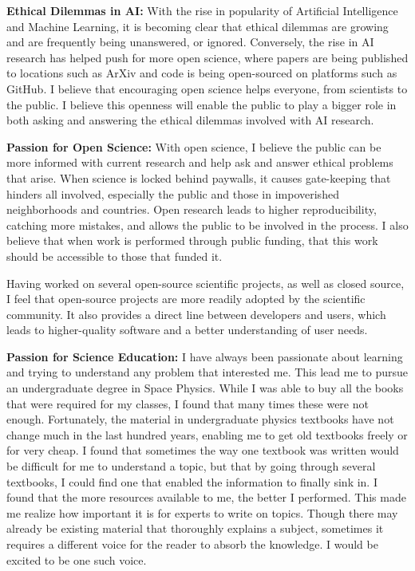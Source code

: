 \documentclass[12pt]{article}
\begin{document}
\textbf{Ethical Dilemmas in AI: }With the rise in popularity of Artificial
Intelligence and Machine Learning, it is becoming clear that ethical dilemmas
are growing and are frequently being unanswered, or ignored. Conversely, the
rise in AI research has helped push for more open science, where papers are
being published to locations such as ArXiv and code is being open-sourced on
platforms such as GitHub. I believe that encouraging open science helps
everyone, from scientists to the public. I believe this openness will enable the
public to play a bigger role in both asking and answering the ethical dilemmas
involved with AI research. 


\textbf{Passion for Open Science: }With open science, I believe the public can
be more informed with current research and help ask and answer ethical problems
that arise. When science is locked behind paywalls, it causes gate-keeping that
hinders all involved, especially the public and those in impoverished neighborhoods and countries. Open research leads to higher reproducibility,
catching more mistakes, and allows the public to be involved in the process. I
also believe that when work is performed through public funding, that this work
should be accessible to those that funded it.

Having worked on several open-source scientific projects, as well as closed
source, I feel that open-source projects are more readily adopted
by the scientific community. It also provides a direct line between developers and
users, which leads to higher-quality software and a better understanding of
user needs. 

\textbf{Passion for Science Education: }I have always been passionate about
learning and trying to understand any problem that interested me. This lead me
to pursue an undergraduate degree in Space Physics. While I was able to buy all
the books that were required for my classes, I found that many times these were
not enough. Fortunately, the material in undergraduate physics textbooks have not
change much in the last hundred years, enabling me to get old textbooks freely
or for very cheap. I found that sometimes the way one textbook was written would
be difficult for me to understand a topic, but that by going through several
textbooks, I could find one that enabled the information to finally sink in. I
found that the more resources available to me, the better I performed. This made
me realize how important it is for experts to write on topics. Though there may
already be existing material that thoroughly explains a subject, sometimes it
requires a different voice for the reader to absorb the knowledge. I would be
excited to be one such voice.
\end{document}
